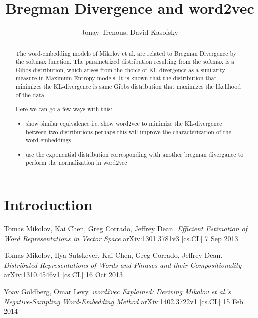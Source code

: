 \documentclass[]{article}
\title{Bregman Divergence and word2vec}
\author{Jonay Trenous, David Kasofsky}
\begin{document}
\maketitle

\begin{abstract}

\noindent The word-embedding models of Mikolov et al. \cite{word2vec1} \cite{word2vec2} are related to Bregman Divergence by the softmax function. The parametrized distribution resulting from the softmax is a Gibbs distribution, which arises from the choice of KL-divergence as a similarity measure in Maximum Entropy models. It is known that the distribution that minimizes the KL-divergence is same Gibbs distribution that maximizes the likelihood of the data.

Here we can go a few ways with this:


\begin{itemize}
	\item show similar equivalence i.e. show word2vec to minimize the KL-divergence between two distributions
	\subitem perhaps this will improve the characterization of the word embeddings
	\item use the exponential distribution corresponding with another bregman divergance to perform the normalization in word2vec
\end{itemize}

\end{abstract}



\section{Introduction}

\begin{thebibliography}{1}
 Tomas Mikolov, Kai Chen, Greg Corrado, Jeffrey Dean. {\em Efficient Estimation of Word Representations in Vector Space} arXiv:1301.3781v3 [cs.CL] 7 Sep 2013

 Tomas Mikolov, Ilya Sutskever, Kai Chen, Greg Corrado, Jeffrey Dean. {\em Distributed Representations of Words and Phrases and their Compositionality} arXiv:1310.4546v1  [cs.CL]  16 Oct 2013

 Yoav Goldberg, Omar Levy. {\em word2vec Explained: Deriving Mikolov et al.'s Negative-Sampling Word-Embedding Method} arXiv:1402.3722v1  [cs.CL]  15 Feb 2014

\end{thebibliography}
\end{document}
